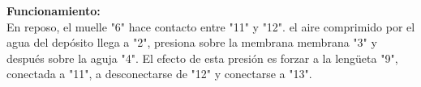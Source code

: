 \documentclass[a5paper,twoside,openany]{book}
\begin{document}
\textbf{Funcionamiento:\\}
En reposo, el muelle "6" hace contacto entre "11" y "12".
el aire comprimido por el agua del depósito llega a "2", presiona sobre la membrana
membrana "3" y después sobre la aguja "4".
El efecto de esta presión es forzar a la lengüeta "9", conectada a "11", a 
desconectarse de "12" y conectarse a "13".
\end{document}
